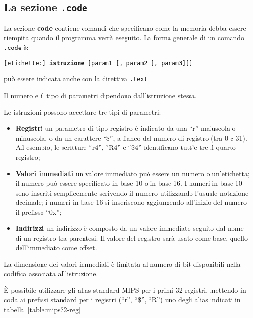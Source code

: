 \documentclass[12pt]{report}
\begin{document}
\subsection{La sezione \texttt{.code}}
La sezione \textbf{code} contiene comandi che specificano come la memoria debba essere riempita 
quando il programma verr\`{a} eseguito. La forma generale di un comando \texttt{.code} \`{e}:

\begin{center}
	\texttt{[etichette:] \textbf{istruzione} [param1 [, param2 [, param3]]]}
\end{center}

 pu\`{o} essere indicata anche con la direttiva \texttt{.text}.

Il numero e il tipo di parametri dipendono dall'istruzione stessa. 

Le istruzioni possono accettare tre tipi di parametri:
\begin{itemize}
	\item \textbf{Registri} un parametro di tipo registro \`e indicato da una
    ``r'' maiuscola o minuscola, o da un carattere ``\$'', a fianco del numero
    di registro (tra 0 e 31). Ad esempio, le scritture ``r4'', ``R4'' e ``\$4''
    identificano tutt'e tre il quarto registro;
	\item \textbf{Valori immediati} un valore immediato pu\`o essere un numero o
    un'etichetta; il numero pu\`o essere specificato in base 10 o in base 16. I
    numeri in base 10 sono inseriti semplicemente scrivendo il numero
    utilizzando l'usuale notazione decimale; i numeri in base 16 si inseriscono
    aggiungendo all'inizio del numero il prefisso ``0x'';
    \item \textbf{Indirizzi} un indirizzo \`e composto da un valore immediato
    seguito dal nome di un registro tra parentesi. Il valore del registro sar\`a
    usato come base, quello dell'immediato come offset.
\end{itemize}

La dimensione dei valori immediati \`{e} limitata al numero di bit disponibili
nella codifica associata all'istruzione. 

\`E possibile utilizzare gli alias standard MIPS per i primi 32 registri,
mettendo in coda ai prefissi standard per i registri (``r'', ``\$'', ``R'') uno
degli alias indicati in tabella~\ref{table:mips32-reg}
\end{document}
